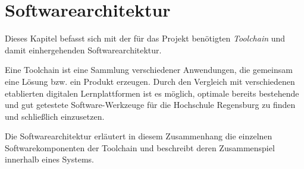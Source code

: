 \section{Softwarearchitektur}\label{softwarearchitektur}
Dieses Kapitel befasst sich mit der für das Projekt benötigten \emph{Toolchain}
und damit einhergehenden Softwarearchitektur.

Eine Toolchain ist eine Sammlung verschiedener Anwendungen, die gemeinsam eine
Lösung bzw. ein Produkt erzeugen. Durch den Vergleich mit verschiedenen
etablierten digitalen Lernplattformen ist es möglich, optimale bereits
bestehende und gut getestete Software-Werkzeuge für die Hochschule Regensburg zu
finden und schließlich einzusetzen.

Die Softwarearchitektur erläutert in diesem Zusammenhang die einzelnen
Softwarekomponenten der Toolchain und beschreibt deren Zusammenspiel innerhalb
eines Systems.



\newpage


\newpage


\newpage
